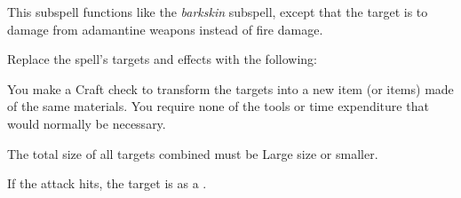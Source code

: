 
This subspell functions like the \textit{barkskin} subspell, except that the target is  to damage from adamantine weapons instead of fire damage.









Replace the spell's targets and effects with the following:
\begin{spellcontent}

\begin{augmenttargetinginfo}



\end{augmenttargetinginfo}


\begin{augmenteffects}



\spelleffect
You make a Craft check to transform the targets into a new item (or items) made of the same materials.
You require none of the tools or time expenditure that would normally be necessary.

The total size of all targets combined must be Large size or smaller.








\end{augmenteffects}

\end{spellcontent}






If the attack hits, the target is  as a .









